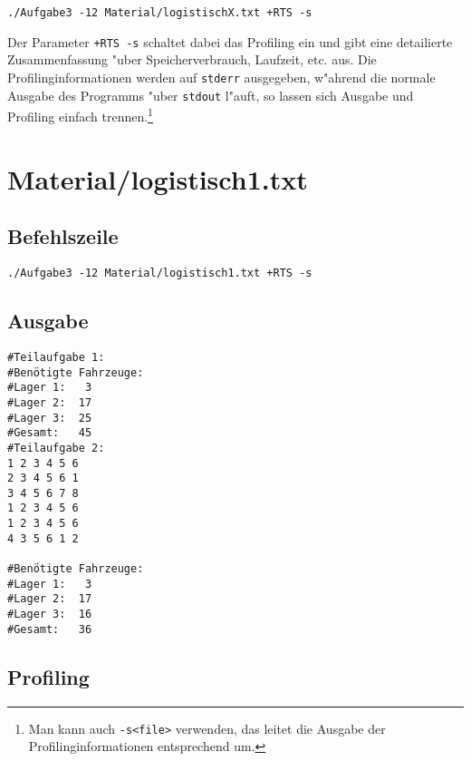 \documentclass{scrreprt}
\begin{document}
\begin{verbatim}
./Aufgabe3 -12 Material/logistischX.txt +RTS -s
\end{verbatim}

Der Parameter \texttt{+RTS -s} schaltet dabei das Profiling ein und gibt eine
detailierte Zusammenfassung "uber Speicherverbrauch, Laufzeit, etc. aus.  Die
Profilinginformationen werden auf \texttt{stderr} ausgegeben, w"ahrend die
normale Ausgabe des Programms "uber \texttt{stdout} l"auft, so lassen sich
Ausgabe und Profiling einfach trennen.\footnote{Man kann auch \texttt{-s<file>}
verwenden, das leitet die Ausgabe der Profilinginformationen entsprechend um.}

\section{Material/logistisch1.txt}

\subsection*{Befehlszeile}

\begin{verbatim}
./Aufgabe3 -12 Material/logistisch1.txt +RTS -s
\end{verbatim}

\subsection*{Ausgabe}

\begin{verbatim}
#Teilaufgabe 1:
#Benötigte Fahrzeuge:
#Lager 1:   3
#Lager 2:  17
#Lager 3:  25
#Gesamt:   45
#Teilaufgabe 2:
1 2 3 4 5 6
2 3 4 5 6 1
3 4 5 6 7 8
1 2 3 4 5 6
1 2 3 4 5 6
4 3 5 6 1 2

#Benötigte Fahrzeuge:
#Lager 1:   3
#Lager 2:  17
#Lager 3:  16
#Gesamt:   36
\end{verbatim}

\subsection*{Profiling}
\end{document}
